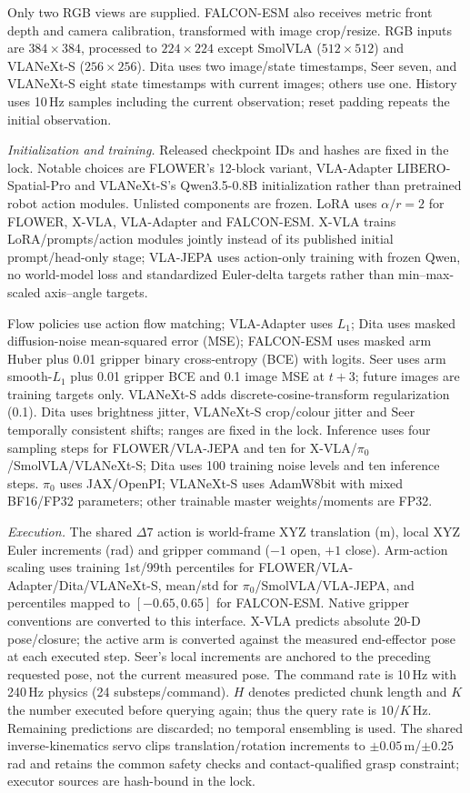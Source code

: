 Only two RGB views are supplied. FALCON-ESM also receives metric front depth and
camera calibration, transformed with image crop/resize. RGB inputs are
$384\times384$, processed to $224\times224$ except SmolVLA ($512\times512$)
and VLANeXt-S ($256\times256$). Dita uses two image/state timestamps, Seer seven,
and VLANeXt-S eight state timestamps with current images; others use one.
History uses 10\,Hz samples including the current observation; reset padding
repeats the initial observation.

\noindent\textit{Initialization and training.}
Released checkpoint IDs and hashes are fixed in the lock. Notable choices are
FLOWER's 12-block variant, VLA-Adapter LIBERO-Spatial-Pro and VLANeXt-S's
Qwen3.5-0.8B initialization rather than pretrained robot action modules.
Unlisted components are frozen. LoRA uses $\alpha/r=2$ for
FLOWER, X-VLA, VLA-Adapter and FALCON-ESM.
X-VLA trains LoRA/prompts/action modules jointly instead of its published
initial prompt/head-only stage; VLA-JEPA uses
action-only training with frozen Qwen, no world-model loss and standardized
Euler-delta targets rather than min--max-scaled axis--angle targets.

Flow policies use action flow matching; VLA-Adapter uses $L_1$;
Dita uses masked diffusion-noise mean-squared error (MSE); FALCON-ESM uses masked arm Huber plus
0.01 gripper binary cross-entropy (BCE) with logits. Seer uses arm smooth-$L_1$
plus 0.01 gripper BCE and 0.1 image MSE at $t+3$; future images are training
targets only. VLANeXt-S adds discrete-cosine-transform regularization (0.1).
Dita uses brightness jitter, VLANeXt-S crop/colour jitter and Seer temporally
consistent shifts; ranges are fixed in the lock. Inference uses four
sampling steps for FLOWER/VLA-JEPA and ten for X-VLA/$\pi_0$/SmolVLA/VLANeXt-S;
Dita uses 100 training noise levels and ten inference steps.
$\pi_0$ uses JAX/OpenPI; VLANeXt-S uses AdamW8bit with mixed BF16/FP32 parameters;
other trainable master weights/moments are FP32.



\noindent\textit{Execution.}
The shared $\Delta7$ action is world-frame XYZ translation (m), local XYZ Euler
increments (rad) and gripper command ($-1$ open, $+1$ close). Arm-action scaling
uses training 1st/99th percentiles for FLOWER/VLA-Adapter/Dita/VLANeXt-S,
mean/std for $\pi_0$/SmolVLA/VLA-JEPA, and percentiles mapped to $[-0.65,0.65]$
for FALCON-ESM. Native gripper conventions are converted to this interface.
X-VLA predicts absolute 20-D pose/closure; the active arm is converted against
the measured end-effector pose at each executed step. Seer's local increments
are anchored to the preceding requested pose, not the current measured pose.
The command rate is 10\,Hz with 240\,Hz physics (24 substeps/command).
$H$ denotes predicted chunk length and $K$ the number executed before querying
again; thus the query rate is $10/K$\,Hz. Remaining predictions are discarded;
no temporal ensembling is used. The shared inverse-kinematics servo clips
translation/rotation increments to $\pm0.05$\,m/$\pm0.25$\,rad and retains the
common safety checks and contact-qualified grasp constraint; executor sources
are hash-bound in the lock.

